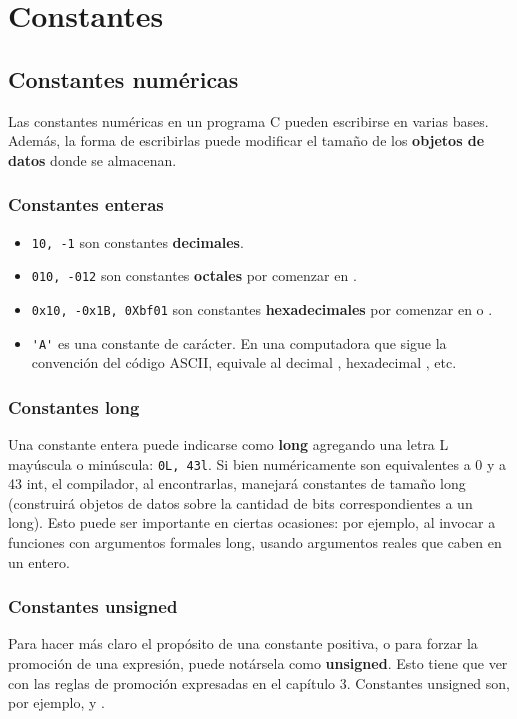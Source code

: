 \chapter{Constantes}

\section{Constantes numéricas}

Las constantes numéricas en un programa C pueden escribirse en varias bases. Además, la forma de escribirlas puede modificar el tamaño de los \textbf{objetos de datos} donde se almacenan.

\subsection{Constantes enteras}
\begin{itemize}
	\item \lstinline{10, -1} son constantes \textbf{decimales}.
	\item \lstinline{010, -012} son constantes \textbf{octales} por comenzar en .
	\item \lstinline{0x10, -0x1B, 0Xbf01} son constantes \textbf{hexadecimales} por comenzar en  o .
	\item \lstinline{'A'} es una constante de carácter. En una computadora que sigue la convención del código ASCII,
equivale al decimal , hexadecimal , etc.
\end{itemize}


\subsection{Constantes long} 
Una constante entera puede indicarse como \textbf{long} agregando una letra L mayúscula o minúscula: \lstinline{0L, 43l}.
Si bien numéricamente son equivalentes a 0 y a 43 int, el compilador, al encontrarlas, manejará
constantes de tamaño long (construirá objetos de datos sobre la cantidad de bits correspondientes a un
long). Esto puede ser importante en ciertas ocasiones: por ejemplo, al invocar a funciones con
argumentos formales long, usando argumentos reales que caben en un entero.
	
\subsection{Constantes unsigned}
Para hacer más claro el propósito de una constante positiva, o para forzar la promoción de una
expresión, puede notársela como \textbf{unsigned}. Esto tiene que ver con las reglas de promoción expresadas
en el capítulo 3. Constantes unsigned son, por ejemplo,  y . 

